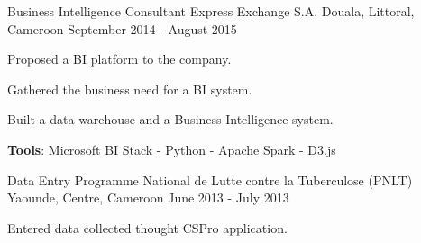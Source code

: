 \begin{cventries}
  \cventry
    {Business Intelligence Consultant} %
    {Express Exchange S.A.} %
    {Douala, Littoral, Cameroon} %
    {September 2014 - August 2015} %
    {
      \begin{cvitems} %
        \item {Proposed a BI platform to the company.}
        \item {Gathered the business need for a BI system.}
        \item {Built a data warehouse and a Business Intelligence system.}
        \item {\textbf{Tools}: Microsoft BI Stack - Python - Apache Spark - D3.js}
      \end{cvitems}
    }

  \cventry
    {Data Entry} %
    {Programme National de Lutte contre la Tuberculose (PNLT)} %
    {Yaounde, Centre, Cameroon} %
    {June 2013 - July 2013} %
    {
      \begin{cvitems} %
        \item {Entered data collected thought CSPro application.}
      \end{cvitems}
    }

\end{cventries}
